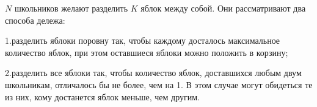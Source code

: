 $N$ школьников желают разделить $K$ яблок между собой. Они рассматривают два способа дележа:

1.разделить яблоки поровну так, чтобы каждому досталось максимальное количество яблок, при этом оставшиеся яблоки можно положить в корзину;

2.разделить все яблоки так, чтобы количество яблок, доставшихся любым двум школьникам, отличалось бы не более, чем на 1. В этом случае могут обидеться те из них, кому достанется яблок меньше, чем другим.